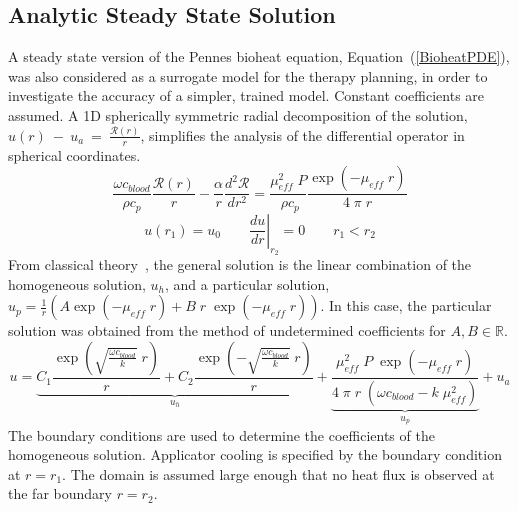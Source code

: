 \documentclass[12pt]{article}
\newcommand{\eqn}[1]{(\ref{#1})}
\begin{document}
\subsection{Analytic Steady State Solution}\label{AnalyticBioheatModel}

A steady state version of the Pennes bioheat equation, Equation~\eqn{BioheatPDE},
was also considered as a surrogate model for the therapy planning, in order to
investigate the accuracy of a simpler, trained model.
Constant coefficients are assumed. A 1D spherically symmetric radial decomposition 
of the solution,
$u(r)~-~u_a~=~\frac{\mathcal{R}(r)}{r}$, simplifies the analysis of the differential operator in
spherical coordinates.
\[
    \frac{\omega c_\textit{blood}}{\rho c_p}  \frac{ \mathcal{R}(r)}{r} 
   -
    \frac{\alpha }{r}   \frac{d^2 \mathcal{R}}{dr^2}
   = 
    \frac{\mu_\textit{eff}^2 \;  P}{ \; \rho c_p}   
    \frac{ \exp \left(-\mu_\textit{eff} \; r \right) }{ 4 \; \pi \; r}
\]
\[
   u(r_1) = u_0
  \qquad
  \left. \frac{d u}{dr} \right|_{r_2}  = 0
  \qquad
   r_1 < r_2
\]
From classical theory~\cite{boyce1992elementary}, 
the general solution is the linear combination of the homogeneous solution, $u_h$, and
a particular solution, 
$ u_p = \frac{1}{r} \left( A \exp (-\mu_\textit{eff} \; r) + B \; r \;  \exp
(-\mu_\textit{eff} \; r) \right) $.
In this case, the particular solution was obtained from the method of undetermined
coefficients for $A,B \in \mathbb{R}$. 
\begin{equation}\label{OneDSolution}
u = 
  \underbrace{
    C_1 \frac{\exp\left( \sqrt{\frac{\omega c_\textit{blood}}{k}} \; r \right)}{r}  
  + 
    C_2 \frac{\exp\left(-\sqrt{\frac{\omega c_\textit{blood}}{k}} \; r \right)}{r}  
    }_{u_h}
  + 
  \underbrace{
    \frac{\mu_\textit{eff}^2 \; P \; \exp \left(-\mu_\textit{eff} \; r \right) }
         { 4 \; \pi \; r \; \left(\omega c_\textit{blood}-k \; \mu_\textit{eff}^2 \right)} 
    }_{u_p}
  + 
    u_a
\end{equation}
The boundary conditions are used to determine the coefficients of the homogeneous solution.
Applicator cooling is specified by the boundary condition at $r = r_1$.
The domain is assumed large enough that no heat flux is observed at the far boundary $r = r_2$.
\end{document}
